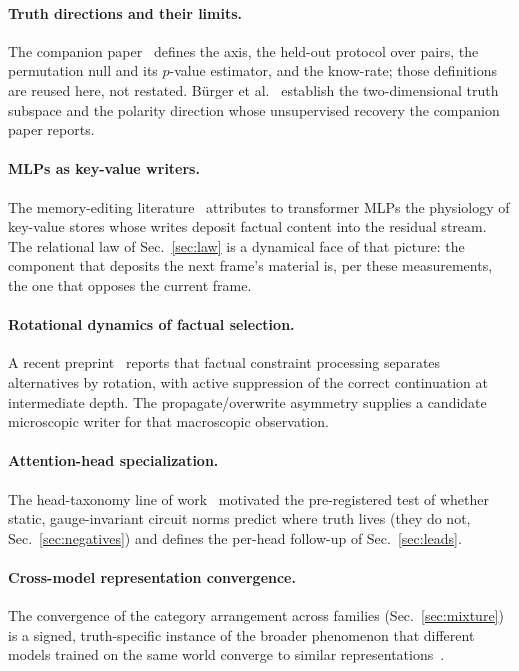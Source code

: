 \documentclass[11pt]{article}
\begin{document}
\paragraph{Truth directions and their limits.} The companion
paper~\cite{companion} defines the axis, the held-out protocol over pairs,
the permutation null and its $p$-value estimator, and the know-rate; those
definitions are reused here, not restated. B\"urger et
al.~\cite{burger2024} establish the two-dimensional truth subspace and the
polarity direction whose unsupervised recovery the companion paper reports.

\paragraph{MLPs as key-value writers.} The memory-editing
literature~\cite{meng2022} attributes to transformer MLPs the physiology of
key-value stores whose writes deposit factual content into the residual
stream. The relational law of Sec.~\ref{sec:law} is a dynamical face of that
picture: the component that deposits the next frame's material is, per these
measurements, the one that opposes the current frame.

\paragraph{Rotational dynamics of factual selection.} A recent
preprint~\cite{rotational2026} reports that factual constraint processing
separates alternatives by rotation, with active suppression of the correct
continuation at intermediate depth. The propagate/overwrite asymmetry
supplies a candidate microscopic writer for that macroscopic observation.

\paragraph{Attention-head specialization.} The head-taxonomy line of
work~\cite{headgenome} motivated the pre-registered test of whether static,
gauge-invariant circuit norms predict where truth lives (they do not,
Sec.~\ref{sec:negatives}) and defines the per-head follow-up of
Sec.~\ref{sec:leads}.

\paragraph{Cross-model representation convergence.} The convergence of the
category arrangement across families (Sec.~\ref{sec:mixture}) is a signed,
truth-specific instance of the broader phenomenon that different models
trained on the same world converge to similar
representations~\cite{platonic2024}.
\end{document}
